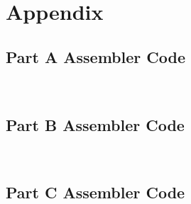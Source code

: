 \documentclass[10pt, letterpaper, titlepage]{article} %
\begin{document}
\newpage

\section{Appendix}
\subsection{Part A Assembler Code}
\begin{lstlisting}
	
\end{lstlisting}

\subsection{Part B Assembler Code}
\begin{lstlisting}
	
\end{lstlisting}

\subsection{Part C Assembler Code}
\begin{lstlisting}
	
\end{lstlisting}
\end{document}
